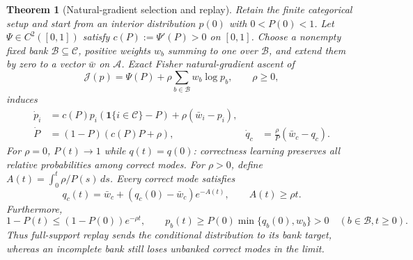 \documentclass{article}
\newcommand{\1}{\mathbf 1}
\newtheorem{theorem}[lemma]{Theorem}
\theoremstyle{remark}
\theoremstyle{definition}
\theoremstyle{plain}
\begin{document}
\begin{theorem}[Natural-gradient selection and replay]
\label{ext:thm-natural-replay}
Retain the finite categorical setup and start from an interior distribution
$p(0)$ with $0<P(0)<1$. Let $\Psi\in C^2([0,1])$ satisfy
$c(P):=\Psi'(P)>0$ on $[0,1]$. Choose a nonempty fixed bank
$\mathcal B\subseteq\mathcal C$, positive weights $w_b$ summing to one over
$\mathcal B$, and extend them by zero to a vector $\bar w$ on
$\mathcal A$. Exact Fisher natural-gradient ascent of
\[
 \mathcal J(p)=\Psi(P)+\rho\sum_{b\in\mathcal B}w_b\log p_b,
 \qquad \rho\ge0,
\]
induces
\begin{align}
 \dot p_i&=c(P)p_i(\mathbf 1\{i\in\mathcal C\}-P)
                     +\rho(\bar w_i-p_i),
 \label{ext:eq-natural-p}\\
 \dot P&=(1-P)(c(P)P+\rho),
 &\dot q_c&=\frac{\rho}{P}(\bar w_c-q_c).
 \label{ext:eq-natural-Pq}
\end{align}
For $\rho=0$, $P(t)\to1$ while $q(t)=q(0)$: correctness learning preserves
all relative probabilities among correct modes. For $\rho>0$, define
$A(t)=\int_0^t\rho/P(s)\,ds$. Every correct mode satisfies
\begin{equation}
 q_c(t)=\bar w_c+(q_c(0)-\bar w_c)e^{-A(t)},
 \qquad A(t)\ge\rho t.
 \label{ext:eq-natural-conditional-solution}
\end{equation}
Furthermore,
\begin{equation}
 1-P(t)\le(1-P(0))e^{-\rho t},
 \qquad
 p_b(t)\ge P(0)\min\{q_b(0),w_b\}>0
 \quad (b\in\mathcal B,t\ge0).
 \label{ext:eq-natural-retention}
\end{equation}
Thus full-support replay sends the conditional distribution to its bank
target, whereas an incomplete bank still loses unbanked correct modes in the
limit.
\end{theorem}
\end{document}
